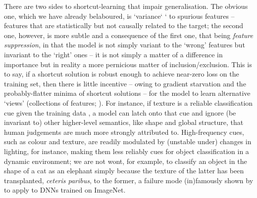 There are two sides to shortcut-learning that impair generalisation.
%
The obvious one, which we have already belaboured, is `variance` ` to spurious features -- features
that are statistically but not causally related to the target; the second one, however, is more
subtle and a consequence of the first one, that being \emph{feature suppression}, in that the model
is not simply variant to the `wrong' features but invariant to the `right' ones -- it is not simply
a matter of a difference in importance but in reality a more pernicious matter of
inclusion/exclusion.
%
This is to say, if a shortcut solution is robust enough to achieve near-zero loss on the training
set, then there is little incentive -- owing to gradient starvation \citep{pezeshki2021gradient}
and the probably-flatter minima of shortcut solutions \citep{scimeca2021shortcut} -- for the model
to learn alternative `views' (collections of features; \cite{allen2020towards}).
%
For instance, if texture is a reliable classification cue given the training data
\cite{geirhos2018imagenet}, a model can latch onto that cue and ignore (be invariant to) other
higher-level semantics, like shape and global structure, that human judgements are much more
strongly attributed to.
%
High-frequency cues, such as colour and texture, are readily modulated by (unstable under) changes
in lighting, for instance, making them less reliably cues for object classification in a dynamic
environment; we are not wont, for example, to classify an object in the shape of a cat as an
elephant simply because the texture of the latter has been transplanted, \emph{ceteris paribus}, to
the former, a failure mode (in)famously shown by \cite{geirhos2018imagenet} to apply to DNNs
trained on ImageNet.

